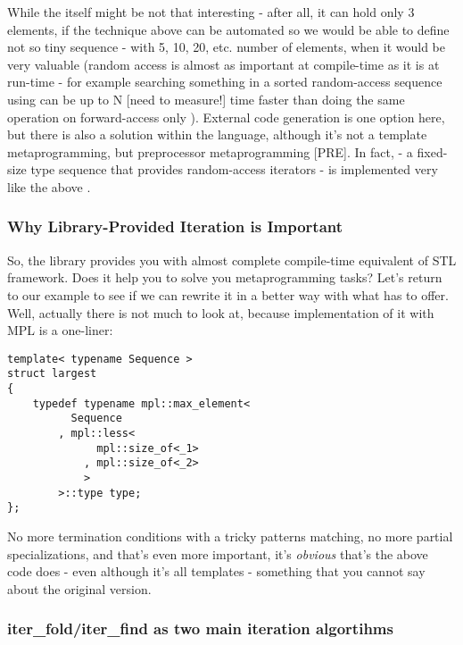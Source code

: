 \documentclass{netobjectdays}
\begin{document}
While the  itself might be not that 
interesting - after all, it can hold only 3 elements, if 
the technique above can be automated so we would be able to 
define not so tiny sequence - with 5, 10, 20, etc. number 
of elements, when it would be very valuable (random access 
is almost as important at compile-time as it is at run-time 
- for example searching something in a sorted random-access 
sequence using  can be up to N 
[need to measure!] time faster than doing the same operation 
on forward-access only ). External code generation 
is one option here, but there is also a solution within the 
language, although it's not a template metaprogramming, 
but preprocessor metaprogramming [PRE]. In fact, 
 - a fixed-size type sequence that 
provides random-access iterators - is implemented very like 
the above . 

\subsubsection{Why Library-Provided Iteration is Important}

So, the library provides you with almost complete compile-time 
equivalent of STL framework. Does it help you to solve you 
metaprogramming tasks? Let's return to our  
example to see if we can rewrite it in a better way with what 
 has to offer. Well, actually there is not 
much to look at, because implementation of it with MPL is a 
one-liner:

{\footnotesize
\begin{verbatim}
template< typename Sequence >
struct largest
{
    typedef typename mpl::max_element<
          Sequence
        , mpl::less<
              mpl::size_of<_1>
            , mpl::size_of<_2>
            >
        >::type type;
};
\end{verbatim}
}

No more termination conditions with a tricky patterns matching, 
no more partial specializations, and that's even more important, 
it's \emph{obvious} that's the above code does - even although 
it's all templates - something that you cannot say about the 
original version.

\subsubsection{iter\_fold/iter\_find as two main iteration 
algortihms}
\end{document}
